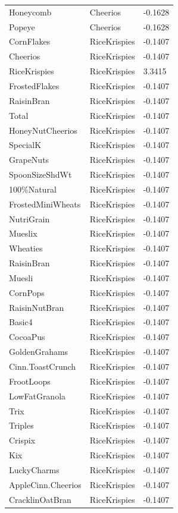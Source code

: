 \begin{table}[!htbp]
\begin{tabular}{lll}
Honeycomb & Cheerios & -0.1628
\\
Popeye & Cheerios & -0.1628
\\
CornFlakes & RiceKrispies & -0.1407
\\
Cheerios & RiceKrispies & -0.1407
\\
RiceKrispies & RiceKrispies & 3.3415
\\
FrostedFlakes & RiceKrispies & -0.1407
\\
RaisinBran & RiceKrispies & -0.1407
\\
Total & RiceKrispies & -0.1407
\\
HoneyNutCheerios & RiceKrispies & -0.1407
\\
SpecialK & RiceKrispies & -0.1407
\\
GrapeNuts & RiceKrispies & -0.1407
\\
SpoonSizeShdWt & RiceKrispies & -0.1407
\\
100\%Natural & RiceKrispies & -0.1407
\\
FrostedMiniWheats & RiceKrispies & -0.1407
\\
NutriGrain & RiceKrispies & -0.1407
\\
Mueslix & RiceKrispies & -0.1407
\\
Wheaties & RiceKrispies & -0.1407
\\
RaisinBran & RiceKrispies & -0.1407
\\
Muesli & RiceKrispies & -0.1407
\\
CornPops & RiceKrispies & -0.1407
\\
RaisinNutBran & RiceKrispies & -0.1407
\\
Basic4 & RiceKrispies & -0.1407
\\
CocoaPus & RiceKrispies & -0.1407
\\
GoldenGrahams & RiceKrispies & -0.1407
\\
Cinn.ToastCrunch & RiceKrispies & -0.1407
\\
FrootLoops & RiceKrispies & -0.1407
\\
LowFatGranola & RiceKrispies & -0.1407
\\
Trix & RiceKrispies & -0.1407
\\
Triples & RiceKrispies & -0.1407
\\
Crispix & RiceKrispies & -0.1407
\\
Kix & RiceKrispies & -0.1407
\\
LuckyCharms & RiceKrispies & -0.1407
\\
AppleCinn.Cheerios & RiceKrispies & -0.1407
\\
CracklinOatBran & RiceKrispies & -0.1407

\end{tabular}
\end{table}
